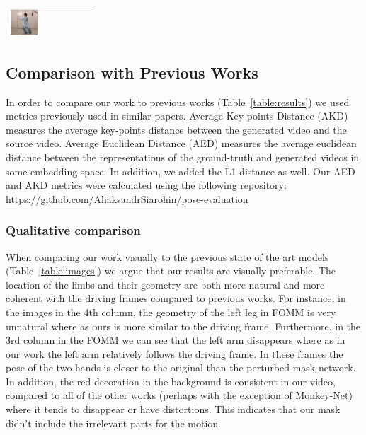 \documentclass{article}
\begin{document}
\begin{table}[t]
\begin{center}
\begin{small}
\begin{sc}
\begin{tabular}{m{1.0cm}m{1.0cm}m{1.0cm}m{1.0cm}m{1.0cm}m{1.0cm}}
\includegraphics[width=1cm, height=1cm]{images/5_Ours_5} \\
\bottomrule
\end{tabular}
\end{sc}
\end{small}
\end{center}
\vskip -0.1in
\end{table}




\subsection{Comparison with Previous Works}
In order to compare our work to previous works (Table~\ref{table:results})
we used metrics previously used in similar papers.
Average Key-points Distance \cite{cao2017realtime} (AKD)
measures the average key-points distance between the generated video and
the source video. Average Euclidean Distance \cite{zheng2019joint} (AED)
measures the average euclidean distance
 between the representations of the ground-truth and generated videos in
 some embedding space. In addition, we added the L1 distance as well.
 Our AED and AKD metrics were calculated using the following repository:
 \url{https://github.com/AliaksandrSiarohin/pose-evaluation}

\subsubsection{Qualitative comparison}
When comparing our work visually to the previous state of the art models
(Table~\ref{table:images}) we argue that our results are visually preferable.
The location of the limbs and their geometry are both more natural and more
coherent with the driving frames compared to previous works. For instance,
in the images in the 4th column, the geometry of the left leg in FOMM
is very unnatural where as ours is more similar to the driving frame.
Furthermore, in the 3rd column in the FOMM we can see that the left arm
disappears where as in our work the left arm relatively follows the driving
frame. In these frames the pose of the two hands is closer to the original
than the perturbed mask network.
In addition, the red decoration in the background is consistent in
our video, compared to all of the other works (perhaps with the exception
of Monkey-Net) where it tends to disappear
or have distortions. This indicates that our mask didn't include the
irrelevant parts for the motion.
\end{document}
